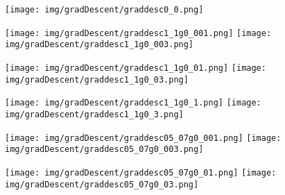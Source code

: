 \documentclass{article}
\begin{document}
\begin{figure}[H]
    \begin{adjustbox}{margin=0pt,center}
        \texttt{[image: img/gradDescent/graddesc0\_0.png]}
    \end{adjustbox}
\end{figure}
\begin{figure}[H]
    \begin{adjustbox}{margin=0pt,center}
        \texttt{[image: img/gradDescent/graddesc1\_1g0\_001.png]}
        \texttt{[image: img/gradDescent/graddesc1\_1g0\_003.png]}
    \end{adjustbox}
\end{figure}
\begin{figure}[H]
    \begin{adjustbox}{margin=0pt,center}
        \texttt{[image: img/gradDescent/graddesc1\_1g0\_01.png]}
        \texttt{[image: img/gradDescent/graddesc1\_1g0\_03.png]}
    \end{adjustbox}
\end{figure}
\begin{figure}[H]
    \begin{adjustbox}{margin=0pt,center}
        \texttt{[image: img/gradDescent/graddesc1\_1g0\_1.png]}
        \texttt{[image: img/gradDescent/graddesc1\_1g0\_3.png]}
    \end{adjustbox}
\end{figure}
\begin{figure}[H]
    \begin{adjustbox}{margin=0pt,center}
        \texttt{[image: img/gradDescent/graddesc05\_07g0\_001.png]}
        \texttt{[image: img/gradDescent/graddesc05\_07g0\_003.png]}
    \end{adjustbox}
\end{figure}
\begin{figure}[H]
    \begin{adjustbox}{margin=0pt,center}
        \texttt{[image: img/gradDescent/graddesc05\_07g0\_01.png]}
        \texttt{[image: img/gradDescent/graddesc05\_07g0\_03.png]}
    \end{adjustbox}
\end{figure}
\end{document}
